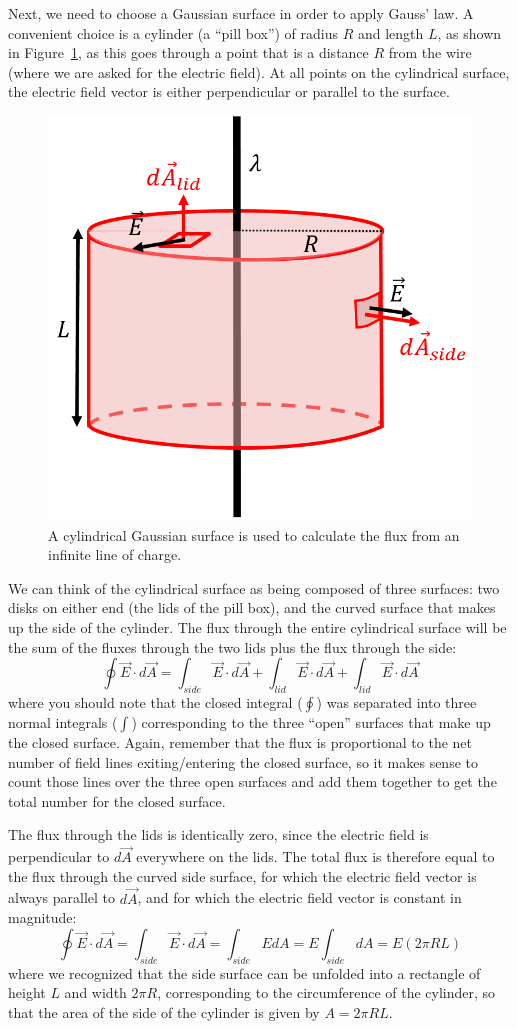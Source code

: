 \begin{framed}
\begin{framed}
Next, we need to choose a Gaussian surface in order to apply Gauss' law. A convenient choice is a cylinder (a ``pill box'') of radius $R$ and length $L$, as shown in Figure~\ref{fig:gauss:fluxlinecharge}, as this goes through a point that is a distance $R$ from the wire (where we are asked for the electric field). At all points on the cylindrical surface, the electric field vector is either perpendicular or parallel to the surface.

\begin{figure}[!htbp]
\centering
\includegraphics[width=0.4\linewidth]{files/fluxlinecharge-5050ac892660d0dcaa40a8b7c9eb94a3.png}
\caption[]{A cylindrical Gaussian surface is used to calculate the flux from an infinite line of charge.}
\label{fig:gauss:fluxlinecharge}
\end{figure}

We can think of the cylindrical surface as being composed of three surfaces: two disks on either end (the lids of the pill box), and the curved surface that makes up the side of the cylinder. The flux through the entire cylindrical surface will be the sum of the fluxes through the two lids plus the flux through the side:
\begin{equation}
\oint \vec E\cdot d\vec A = \int_{side} \vec E\cdot d\vec A + \int_{lid}\vec E\cdot d\vec A + \int_{lid}\vec E\cdot d\vec A
\end{equation}
where you should note that the closed integral ($\oint$) was separated into three normal integrals ($\int$) corresponding to the three ``open'' surfaces that make up the closed surface. Again, remember that the flux is proportional to the net number of field lines exiting/entering the closed surface, so it makes sense to count those lines over the three open surfaces and add them together to get the total number for the closed surface.

The flux through the lids is identically zero, since the electric field is perpendicular to $d\vec A$ everywhere on the lids. The total flux is therefore equal to the flux through the curved side surface, for which the electric field vector is always parallel to $d\vec A$, and for which the electric field vector is constant in magnitude:
\begin{equation}
\oint \vec E\cdot d\vec A = \int_{side} \vec E\cdot d\vec A =\int_{side} EdA=E\int_{side}dA=E(2\pi R L)
\end{equation}
where we recognized that the side surface can be unfolded into a rectangle of height $L$ and width $2\pi R$, corresponding to the circumference of the cylinder, so that the area of the side of the cylinder is given by $A=2\pi R L$.


\end{framed}
\end{framed}
